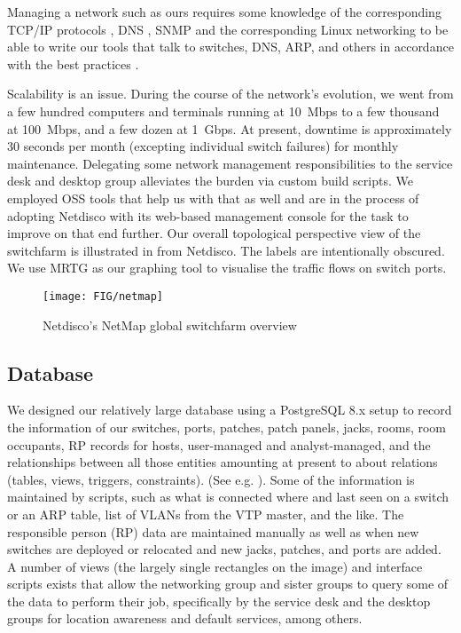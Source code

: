 Managing a network such as ours requires some knowledge
of the corresponding TCP/IP protocols \cite{tcp-ip-net-admin-93},
DNS \cite{dns-and-bind-98}, SNMP \cite{stallings-snmp-99,essential-snmp-2001} and
the corresponding Linux networking \cite{linux-net-cookbook-2008}
to be able to write our tools that talk to switches, DNS,
ARP, and others in accordance with the best practices
\cite{practice-sys-net-admin-99,net-management-2000}.

Scalability is an issue.
During the course of the network's evolution, we went from
a few hundred computers and terminals running at 10~Mbps
to a few thousand at 100~Mbps, and a few dozen at 1~Gbps.
At present, downtime is approximately 30 seconds per month
(excepting individual switch failures) for monthly maintenance.
Delegating some network management responsibilities to the
service desk and desktop group alleviates the burden via custom
build scripts. We employed OSS tools that help us with that as
well and are in the process of adopting Netdisco
\cite{netdisco}
with its web-based management console for the task to improve on
that end further.
Our overall topological perspective view of the switchfarm
is illustrated in  from Netdisco. The labels are
intentionally obscured.
We use MRTG
\cite{mrtg,essential-snmp-2001}
as our graphing tool
to visualise the traffic flows on switch ports.

\begin{figure}[htbp!]
	\centering
	\texttt{[image: FIG/netmap]}
	\caption{Netdisco's NetMap global switchfarm overview}
	\label{fig:netmap}
\end{figure}


\subsection{Database}
\label{sect:database}

We designed our relatively large database using a PostgreSQL 8.x
\cite{postgres}
setup to record the information of
our switches, ports, patches, patch panels, jacks, rooms,
room occupants, RP records for hosts, user-managed and analyst-managed,
and the relationships between all those entities amounting at
present to about {\dbentities} relations (tables, views, triggers, constraints).
(See e.g. ).
Some of the information is maintained by scripts, such as what is connected where
and last seen on a switch or an ARP table, list of VLANs from the VTP master,
and the like. The responsible person (RP) data are maintained manually as well as when new
switches are deployed or relocated and new jacks, patches, and ports are added.
A number of views
(the largely single rectangles on the image)
and interface scripts exists that allow
the networking group and sister groups to query some of the data to perform their job, specifically
by the service desk and the desktop groups for location awareness and default
services, among others.

